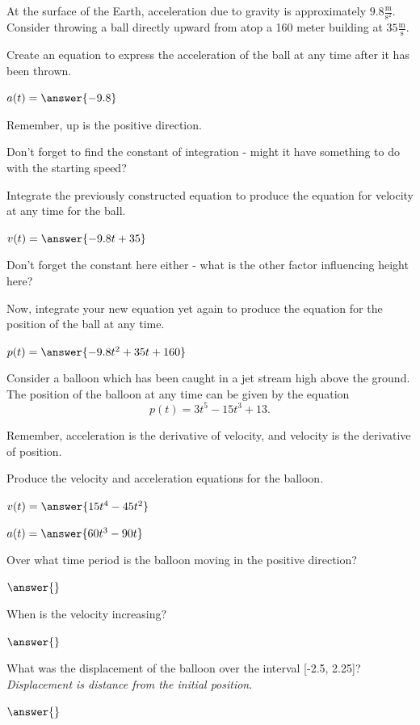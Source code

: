 \documentclass{ximera}
\begin{document}
\begin{question}
At the surface of the Earth, acceleration due to gravity is approximately $9.8 \frac{\text{m}}{\text{s}^2}$. Consider throwing a ball directly upward from atop a 160 meter building at $35 \frac{\text{m}}{\text{s}}$.

Create an equation to express the acceleration of the ball at any time after it has been thrown.

$a(t) = \answer{-9.8}$
\begin{feedback}
Remember, up is the positive direction.
\end{feedback}

\begin{hint}
Don't forget to find the constant of integration - might it have something to do with the starting speed?
\end{hint}
Integrate the previously constructed equation to produce the equation for velocity at any time for the ball.

$v(t) = \answer{-9.8t+35}$

\begin{hint}
Don't forget the constant here either - what is the other factor influencing height here?
\end{hint}
Now, integrate your new equation yet again to produce the equation for the position of the ball at any time.

$p(t) = \answer{-9.8t^2+35t+160}$
\end{question}
\begin{question}
Consider a balloon which has been caught in a jet stream high above the ground. The position of the balloon at any time can be given by the equation $$p(t) = 3t^5-15t^3+13\text{.}$$

\begin{hint}
Remember, acceleration is the derivative of velocity, and velocity is the derivative of position.
\end{hint}
Produce the velocity and acceleration equations for the balloon.

$v(t) = \answer{15t^4-45t^2}$

$a(t) = \answer{60t^3-90t}$

Over what time period is the balloon moving in the positive direction?

$\answer{}$

When is the velocity increasing?

$\answer{}$

What was the displacement of the balloon over the interval [-2.5, 2.25]? \textit{Displacement is distance from the initial position}.

$\answer{}$
\end{question}
\end{document}
